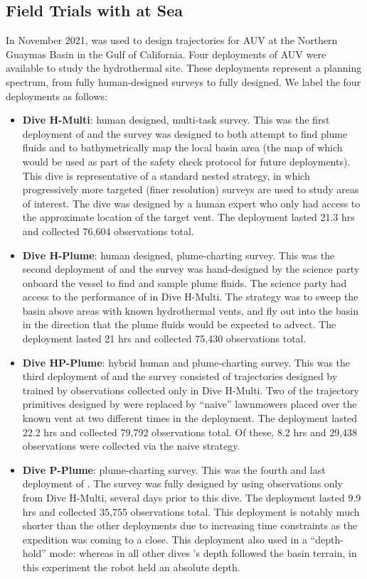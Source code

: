 \subsection{Field Trials with \PHORTEX at Sea}
In November 2021, \PHORTEX was used to design trajectories for AUV \Sentry at the Northern Guaymas Basin in the Gulf of California. Four deployments of AUV \Sentry were available to study the hydrothermal site. These deployments represent a planning spectrum, from fully human-designed surveys to fully \PHORTEX designed. We label the four deployments as follows:
\begin{itemize}
    \item \textbf{Dive H-Multi}: human designed, multi-task survey. This was the first deployment of \Sentry and the survey was designed to both attempt to find plume fluids and to bathymetrically map the local basin area (the map of which would be used as part of the safety check protocol for future deployments). This dive is representative of a standard nested strategy, in which progressively more targeted (finer resolution) surveys are used to study areas of interest. The dive was designed by a human expert who only had access to the approximate location of the target vent. The deployment lasted 21.3 hrs and collected 76,604 observations total.
    \item \textbf{Dive H-Plume}: human designed, plume-charting survey. This was the second deployment of \Sentry and the survey was hand-designed by the science party onboard the vessel to find and sample plume fluids. The science party had access to the performance of \Sentry in Dive H-Multi. The strategy was to sweep the basin above areas with known hydrothermal vents, and fly out into the basin in the direction that the plume fluids would be expected to advect. The deployment lasted 21 hrs and collected 75,430 observations total.
    \item \textbf{Dive HP-Plume}: hybrid human and \PHORTEX plume-charting survey. This was the third deployment of \Sentry and the survey consisted of trajectories designed by \PHORTEX trained by observations collected only in Dive H-Multi. Two of the trajectory primitives designed by \PHORTEX were replaced by ``naive'' lawnmowers placed over the known vent at two different times in the deployment. The deployment lasted 22.2 hrs and collected 79,792 observations total. Of these, 8.2 hrs and 29,438 observations were collected via the naive strategy.
    \item \textbf{Dive P-Plume}: \PHORTEX plume-charting survey. This was the fourth and last deployment of \Sentry. The survey was fully designed by \PHORTEX using observations only from Dive H-Multi, several days prior to this dive. The deployment lasted 9.9 hrs and collected 35,755 observations total. This deployment is notably much shorter than the other deployments due to increasing time constraints as the expedition was coming to a close. This deployment also used \Sentry in a ``depth-hold'' mode: whereas in all other dives \Sentry's depth followed the basin terrain, in this experiment the robot held an absolute depth.
\end{itemize}

